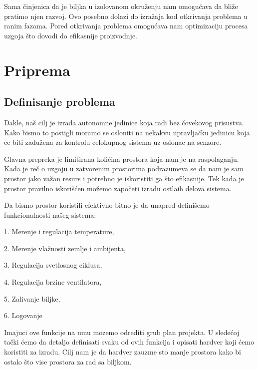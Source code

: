 \documentclass[a4paper,11pt]{book}
\makeatletter
\newenvironment{chapquote}[2][2em]
  {\setlength{\@tempdima}{#1}%
   \def\chapquote@author{#2}%
   \parshape 1 \@tempdima \dimexpr\textwidth-2\@tempdima\relax%
   \itshape}
  {\par\normalfont\hfill--\ \chapquote@author\hspace*{\@tempdima}\par\bigskip}
\makeatother
\begin{document}
\noindent Sama činjenica da je biljka u izolovanom okruženju nam omogućava da bliže pratimo njen razvoj. Ovo posebno dolazi do izražaja kod otkrivanja problema u ranim fazama. Pored otkrivanja problema omogućava nam optimizaciju procesa uzgoja što dovodi do efikasnije proizvodnje.

\chapter{Priprema}


\section{Definisanje problema}
Dakle, naš cilj je izrada autonomne jedinice koja radi bez čovekovog prisustva. Kako bismo to postigli moramo se osloniti na nekakvu upravljačku jedinicu koja ce biti zadužena za kontrolu celokupnog sistema uz oslonac na senzore. 

Glavna prepreka je limitirana količina prostora koja nam je na raspolaganju. Kada je reč o uzgoju u zatvorenim prostorima podrazumeva se da nam je sam prostor jako važan resurs i potrebno je iskoristiti ga što efikasnije. Tek kada je prostor pravilno iskorišćen možemo započeti izradu ostlaih delova sistema.

Da bismo prostor koristili efektivno bitno je da unapred definišemo funkcionalnosti našeg sistema: 

\hrulefill

1. Merenje i regulacija temperature,

2. Merenje vlažnosti zemlje i ambijenta,

3. Regulacija svetlosnog ciklusa,

4. Regulacija brzine ventilatora,

5. Zalivanje biljke,

6. Logovanje 

\hrulefill

\noindent Imajuci ove funkcije na umu mozemo odrediti grub plan projekta. U sledećoj tački ćemo da detaljo definisati svaku od ovih funkcija i opisati hardver koji ćemo koristiti za izradu. Cilj nam je da hardver zauzme sto manje prostora kako bi ostalo što vise prostora za rad sa biljkom.
\end{document}

